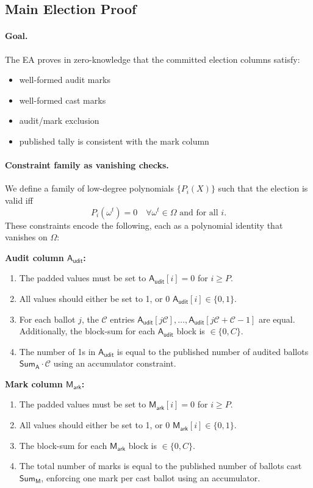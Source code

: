 \subsection{Main Election Proof}
\paragraph{Goal.}
The EA proves in zero-knowledge that the committed election columns satisfy:
\begin{itemize}
\item well-formed audit marks
\item well-formed cast marks
\item audit/mark exclusion
\item published tally is consistent with the mark column
\end{itemize}


\paragraph{Constraint family as vanishing checks.}
We define a family of low-degree polynomials $\{P_i(X)\}$ such that the election is valid iff
\begin{equation*}
P_i(\omega^t)=0 \quad \forall \omega^t\in\Omega \text{ and for all } i.
\end{equation*}
These constraints encode the following, each as a polynomial identity that vanishes on $\Omega$:

\noindent\textbf{Audit column $\mathsf{A_{udit}}$:}
\begin{enumerate}
  \item The padded values must be set to $\mathsf{A_{udit}}[i]=0$ for $i\ge P$.
  \item All values should either be set to 1, or 0 $\mathsf{A_{udit}}[i]\in\{0,1\}$.
  \item For each ballot $j$, the $\mathcal{C}$ entries $\mathsf{A_{udit}}[j\mathcal{C}],\dots,\mathsf{A_{udit}}[j\mathcal{C}+\mathcal{C}-1]$ are equal.
  Additionally, the block-sum for each $\mathsf{A_{udit}}$ block is $\in\{0,C\}$.
  \item The number of 1s in $\mathsf{A_{udit}}$ is equal to the published number of audited ballots $\mathsf{Sum_A}\cdot \mathcal{C}$ using an accumulator constraint.
\end{enumerate}

\noindent\textbf{Mark column $\mathsf{M_{ark}}$:}
\begin{enumerate}
  \item The padded values must be set to $\mathsf{M_{ark}}[i]=0$ for $i\ge P$.
  \item All values should either be set to 1, or 0 $\mathsf{M_{ark}}[i]\in\{0,1\}$.
  \item The block-sum for each $\mathsf{M_{ark}}$ block is $\in\{0,C\}$.
  \item The total number of marks is equal to the published number of ballots cast $\mathsf{Sum_M}$, enforcing one mark per cast ballot using an accumulator.
\end{enumerate}

